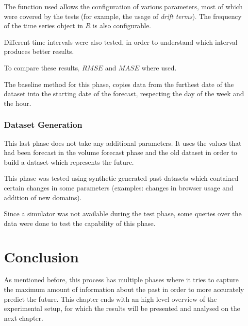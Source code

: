 The function used allows the configuration of various parameters, most of which
were covered by the tests (for example, the usage of \emph{drift terms}).
The frequency of the time series object in
$R$ is also configurable.

Different time intervals were also tested, in order to understand which interval
produces better results.

To compare these results, $RMSE$ and $MASE$ where used.

The baseline method for this phase, copies data from the furthest date of the
dataset into the starting date of the forecast, respecting the day of the week
and the hour.

\subsubsection*{Dataset Generation}

This last phase does not take any additional parameters. It uses the values
that had been forecast in the volume forecast phase and the old dataset in order to build
a dataset which represents the future.

This phase was tested using synthetic generated past datasets which contained certain
changes in some parameters (examples: changes in browser usage and addition
of new domains).

Since a simulator was not available during the test phase, some queries over the
data were done to test the capability of this phase.

\section{Conclusion}

As mentioned before, this process has multiple phases where it tries to capture the
maximum amount of information about the past in order to more accurately predict
the future.
This chapter ends with an high level overview of the experimental setup, for which
the results will be presented and analysed on the next chapter.

